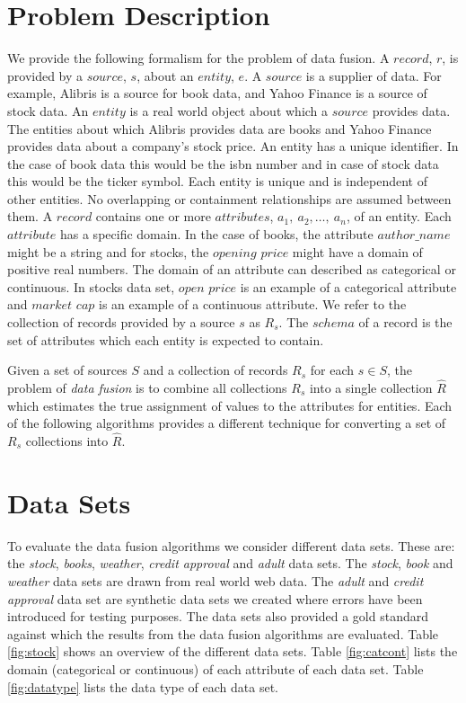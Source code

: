 \documentclass{acm_proc_article-sp}
\begin{document}
\section{Problem Description}
We provide the following formalism for the problem of data fusion. A $record$, $r$, is provided by a $source$, $s$, about an $entity$, $e$. A $source$ is a supplier of data. For example, Alibris is a source for book data, and Yahoo Finance is a source of stock data.  An $entity$ is a real world object about which a $source$ provides data. The entities about which Alibris provides data are books and Yahoo Finance provides data about a company's stock price. An entity has a unique identifier. In the case of book data this would be the isbn number and in case of stock data this would be the ticker symbol. Each entity is unique and is independent of other entities. No overlapping or containment relationships are assumed between them. A $record$ contains one or more $attributes$, $a_1,\ a_2,\dots,\ a_n$, of an entity. Each $attribute$ has a specific domain. In the case of books, the attribute $author\_name$ might be a string and for stocks, the $opening$ $price$ might have a domain of positive real numbers.  The domain of an attribute can described as categorical or continuous. In stocks data set, $open$ $price$ is an example of a categorical attribute and $market$ $cap$  is an example of a continuous attribute. We refer to the collection of records provided by a source $s$ as $R_s$. The $schema$ of a record is the set of attributes which each entity is expected to contain. 


Given a set of sources $S$ and a collection of records $R_s$ for each $s \in S$, the problem of \emph{data fusion} is to combine all collections $R_s$ into a single collection $\hat{R}$ which estimates the true assignment of values to the attributes for entities.  Each of the following algorithms provides a different technique for converting a set of $R_s$ collections into $\hat{R}$. 

\section{Data Sets} \label{sec:data_sets}
To evaluate the data fusion algorithms we consider different data sets. These are: the \emph{stock}, \emph{books}, \emph{weather}, \emph{credit approval} and \emph{adult} data sets. The \emph{stock}, \emph{book} and \emph{weather} data sets are drawn from real world web data. The \emph{adult} and \emph{credit approval} data set are synthetic data sets we created where errors have been introduced for testing purposes. The data sets also provided a gold standard against which the results from the data fusion algorithms are evaluated. Table \ref{fig:stock} shows an overview of the different data sets. Table \ref{fig:catcont} lists the domain (categorical or continuous) of each attribute of each data set. Table \ref{fig:datatype} lists the data type of each data set.  \\
\end{document}
